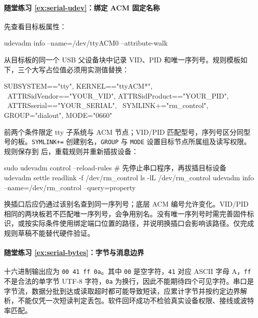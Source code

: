 \paragraph*{随堂练习 \ref{ex:serial-udev}：绑定 ACM 固定名称}
\begin{solution}
先查看目标板属性：

\begin{tbash}
udevadm info --name=/dev/ttyACM0 --attribute-walk
\end{tbash}

从目标板的同一个 USB 父设备块中记录 VID、PID 和唯一序列号。规则模板如下，三个大写占位值必须用实测值替换：

\begin{tbash}
SUBSYSTEM=="tty", KERNEL=="ttyACM*", \
  ATTRS{idVendor}=="YOUR_VID", ATTRS{idProduct}=="YOUR_PID", \
  ATTRS{serial}=="YOUR_SERIAL", \
  SYMLINK+="rm_control", GROUP="dialout", MODE="0660"
\end{tbash}

前两个条件限定 tty 子系统与 ACM 节点；VID/PID 匹配型号，序列号区分同型号的板。\texttt{SYMLINK+=} 创建别名，\texttt{GROUP} 与 \texttt{MODE} 设置目标节点所属组及读写权限。规则保存到  后，重载规则并重新插拔设备：

\begin{tbash}
sudo udevadm control --reload-rules
# 先停止串口程序，再拔插目标设备
udevadm settle
readlink -f /dev/rm_control
ls -lL /dev/rm_control
udevadm info --name=/dev/rm_control --query=property
\end{tbash}

换插口后应仍通过该别名查到同一序列号；底层 ACM 编号允许变化。VID/PID 相同的两块板若不匹配唯一序列号，会争用别名。没有唯一序列号时需完善固件标识，或按实际条件使用绑定端口位置的路径，并说明换插口会影响该路径。仅完成规则草稿不能替代硬件验证。
\end{solution}

\paragraph*{随堂练习 \ref{ex:serial-bytes}：字节与消息边界}
\begin{solution}
十六进制输出应为 \texttt{00 41 ff 0a}。其中 \texttt{00} 是空字符，\texttt{41} 对应 ASCII 字母 A，\texttt{ff} 不是合法的单字节 UTF-8 字符，\texttt{0a} 为换行，因此不能期待四个可见字符。串口是字节流，数据分批到达或读取超时都可能导致短读，应累计字节并按约定边界解析，不能仅凭一次短读判定丢包。软件回环成功不检验真实设备权限、接线或波特率匹配。
\end{solution}

